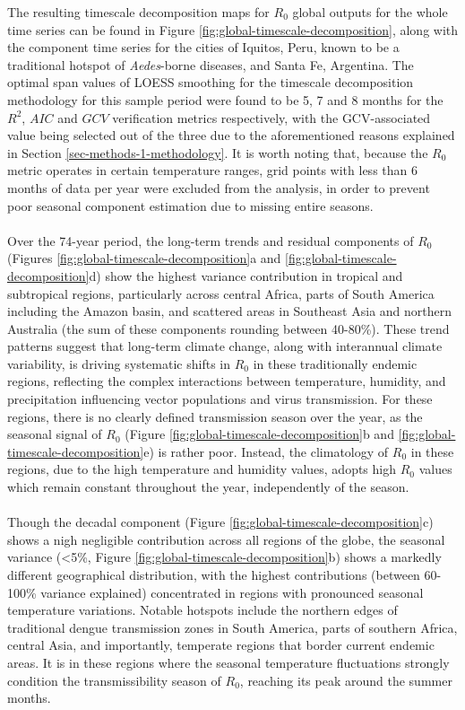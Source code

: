 \documentclass[10pt,twocolumn]{wlscirep}
\begin{document}
The resulting timescale decomposition maps for $R_0$ global outputs for the whole time series can be found in Figure \ref{fig:global-timescale-decomposition}, along with the component time series for the cities of Iquitos, Peru, known to be a traditional hotspot of \textit{Aedes}-borne diseases, and Santa Fe, Argentina. The optimal span values of LOESS smoothing for the timescale decomposition methodology for this sample period were found to be 5, 7 and 8 months for the $R^2$, $AIC$ and $GCV$ verification metrics respectively, with the GCV-associated value being selected out of the three due to the aforementioned reasons explained in Section \ref{sec-methods-1-methodology}. It is worth noting that, because the $R_0$ metric operates in certain temperature ranges, grid points with less than 6 months of data per year were excluded from the analysis, in order to prevent poor seasonal component estimation due to missing entire seasons.
\\
\\
Over the 74-year period, the long-term trends and residual components of $R_0$ (Figures \ref{fig:global-timescale-decomposition}a and \ref{fig:global-timescale-decomposition}d) show the highest variance contribution in tropical and subtropical regions, particularly across central Africa, parts of South America including the Amazon basin, and scattered areas in Southeast Asia and northern Australia (the sum of these components rounding between 40-80\%). These trend patterns suggest that long-term climate change, along with interannual climate variability, is driving systematic shifts in $R_0$ in these traditionally endemic regions, reflecting the complex interactions between temperature, humidity, and precipitation influencing vector populations and virus transmission. For these regions, there is no clearly defined transmission season over the year, as the seasonal signal of $R_0$ (Figure \ref{fig:global-timescale-decomposition}b and \ref{fig:global-timescale-decomposition}e) is rather poor. Instead, the climatology of $R_0$ in these regions, due to the high temperature and humidity values, adopts high $R_0$ values which remain constant throughout the year, independently of the season.
\\
\\
Though the decadal component (Figure \ref{fig:global-timescale-decomposition}c) shows a nigh negligible contribution across all regions of the globe, the seasonal variance (<5\%, Figure \ref{fig:global-timescale-decomposition}b) shows a markedly different geographical distribution, with the highest contributions (between 60-100\% variance explained) concentrated in regions with pronounced seasonal temperature variations. Notable hotspots include the northern edges of traditional dengue transmission zones in South America, parts of southern Africa, central Asia, and importantly, temperate regions that border current endemic areas. It is in these regions where the seasonal temperature fluctuations strongly condition the transmissibility season of $R_0$, reaching its peak around the summer months.
\end{document}
